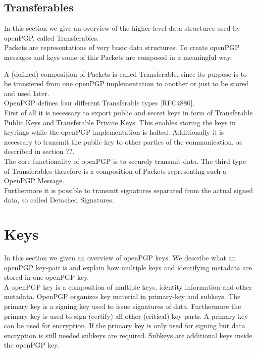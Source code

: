 \subsection{Transferables}

In this section we give an overview of the higher-level data structures used by openPGP, called Transferables.  \\

Packets are representations of very basic data structures. To create openPGP messages and keys some of this Packets are composed in a meaningful way.

A (defined) composition of Packets is called Transferable, since its purpose is to be transfered from one openPGP implementation to another or just to be stored and used later. \\

OpenPGP defines four different Transferable types [RFC4880]. \\

First of all it is necessary to export public and secret keys in form of Transferable Public Keys and Transferable Private Keys. This enables storing the keys in keyrings while the openPGP implementation is halted. Additionally it is necessary to transmit the public key to other parties of the communication, as described in section ??.  \\

The core functionality of openPGP is to securely transmit data. The third type of Transferables therefore is a composition of Packets representing such a OpenPGP Message. \\

Furthermore it is possible to transmit signatures separated from the actual signed data, so called Detached Signatures.

\section{Keys}

In this section we given an overview of openPGP keys. We describe what an openPGP key-pair is and explain how multiple keys and identifying metadata are stored in one openPGP key. \\

A openPGP key is a composition of multiple keys, identity information and other metadata. OpenPGP organizes key material in primary-key and subkeys. The primary key is a signing key used to issue signatures of data. Furthermore the primary key is used to sign (certify) all other (critical) key parts. A primary key can be used for encryption. If the primary key is only used for  signing but data encryption is still needed subkeys are required. Subkeys are additional keys inside the openPGP key. 

